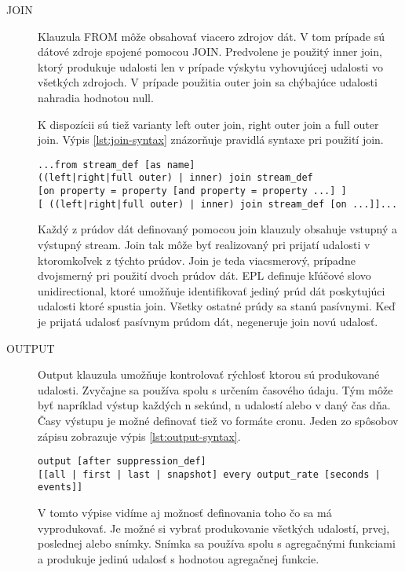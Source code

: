 \begin{description}
			\item[JOIN] Klauzula FROM môže obsahovať viacero zdrojov dát. V tom prípade sú dátové zdroje spojené pomocou JOIN. Predvolene je použitý inner join, ktorý produkuje udalosti len v prípade výskytu vyhovujúcej udalosti vo všetkých zdrojoch. V prípade použitia outer join sa chýbajúce udalosti nahradia hodnotou null.
	
			K dispozícii sú tiež varianty left outer join, right outer join a full outer join. Výpis \ref{lst:join-syntax} znázorňuje pravidlá syntaxe pri použití join.
			\begin{lstlisting}[label=lst:join-syntax,caption=Syntax JOIN klauzuly \cite{web:esper-doc}]
...from stream_def [as name] 
((left|right|full outer) | inner) join stream_def 
[on property = property [and property = property ...] ]
[ ((left|right|full outer) | inner) join stream_def [on ...]]...
			\end{lstlisting}
			Každý z prúdov dát definovaný pomocou join klauzuly obsahuje vstupný a výstupný stream. Join tak môže byť realizovaný pri prijatí udalosti v ktoromkoľvek z týchto prúdov. Join je teda viacsmerový, prípadne dvojsmerný pri použití dvoch prúdov dát.
			EPL definuje kľúčové slovo unidirectional, ktoré umožňuje identifikovať jediný prúd dát poskytujúci udalosti ktoré spustia join. Všetky ostatné prúdy sa stanú pasívnymi. Keď je prijatá udalosť pasívnym prúdom dát, negeneruje join novú udalosť.
	
			\item[OUTPUT] Output klauzula umožňuje kontrolovať rýchlosť ktorou sú produkované udalosti. Zvyčajne sa používa spolu s určením časového údaju. Tým môže byť napríklad výstup každých n sekúnd, n udalostí alebo v daný čas dňa. Časy výstupu je možné definovať tiež vo formáte cronu. Jeden zo spôsobov zápisu zobrazuje výpis \ref{lst:output-syntax}.
			\begin{lstlisting}[label=lst:output-syntax,caption=Syntax OUTPUT klauzuly \cite{web:esper-doc}]
output [after suppression_def] 
[[all | first | last | snapshot] every output_rate [seconds | events]]
			\end{lstlisting}
			V tomto výpise vidíme aj možnosť definovania toho čo sa má vyprodukovať. Je možné si vybrať produkovanie všetkých udalostí, prvej, poslednej alebo snímky. Snímka sa používa spolu s agregačnými funkciami a produkuje jedinú udalosť s hodnotou agregačnej funkcie.
		\end{description}

